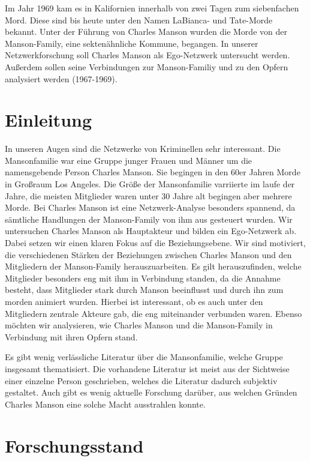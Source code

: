 \documentclass[
]{article}
\begin{document}
Im Jahr 1969 kam es in Kalifornien innerhalb von zwei Tagen zum
siebenfachen Mord. Diese sind bis heute unter den Namen LaBianca- und
Tate-Morde bekannt. Unter der Führung von Charles Manson wurden die
Morde von der Manson-Family, eine sektenähnliche Kommune, begangen. In
unserer Netzwerkforschung soll Charles Manson als Ego-Netzwerk
untersucht werden. Außerdem sollen seine Verbindungen zur Manson-Familiy
und zu den Opfern analysiert werden (1967-1969).

\hypertarget{einleitung}{%
\section{Einleitung}\label{einleitung}}

In unseren Augen sind die Netzwerke von Kriminellen sehr interessant.
Die Mansonfamilie war eine Gruppe junger Frauen und Männer um die
namensgebende Person Charles Manson. Sie begingen in den 60er Jahren
Morde in Großraum Los Angeles. Die Größe der Mansonfamilie varriierte im
laufe der Jahre, die meisten Mitglieder waren unter 30 Jahre alt
begingen aber mehrere Morde. Bei Charles Manson ist eine
Netzwerk-Analyse besonders spannend, da sämtliche Handlungen der
Manson-Family von ihm aus gesteuert wurden. Wir untersuchen Charles
Manson als Hauptakteur und bilden ein Ego-Netzwerk ab. Dabei setzen wir
einen klaren Fokus auf die Beziehungsebene. Wir sind motiviert, die
verschiedenen Stärken der Beziehungen zwischen Charles Manson und den
Mitgliedern der Manson-Family herauszuarbeiten. Es gilt herauszufinden,
welche Mitglieder besonders eng mit ihm in Verbindung standen, da die
Annahme besteht, dass Mitglieder stark durch Manson beeinflusst und
durch ihn zum morden animiert wurden. Hierbei ist interessant, ob es
auch unter den Mitgliedern zentrale Akteure gab, die eng miteinander
verbunden waren. Ebenso möchten wir analysieren, wie Charles Manson und
die Manson-Family in Verbindung mit ihren Opfern stand.

Es gibt wenig verlässliche Literatur über die Mansonfamilie, welche
Gruppe insgesamt thematisiert. Die vorhandene Literatur ist meist aus
der Sichtweise einer einzelne Person geschrieben, welches die Literatur
dadurch subjektiv gestaltet. Auch gibt es wenig aktuelle Forschung
darüber, aus welchen Gründen Charles Manson eine solche Macht
ausstrahlen konnte.

\hypertarget{forschungsstand}{%
\section{Forschungsstand}\label{forschungsstand}}
\end{document}
